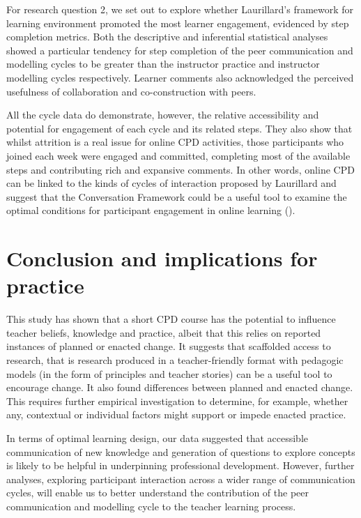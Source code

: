 \documentclass[output=paper]{langscibook}
\begin{document}
For research question 2, we set out to explore whether Laurillard’s framework for learning environment promoted the most learner engagement, evidenced by step completion metrics. Both the descriptive and inferential statistical analyses showed a particular tendency for step completion of the peer communication and modelling cycles to be greater than the instructor practice and instructor modelling cycles respectively. Learner comments also acknowledged the perceived usefulness of collaboration and co-construction with peers.

All the cycle data do demonstrate, however, the relative accessibility and potential for engagement of each cycle and its related steps. They also show that whilst attrition is a real issue for online CPD activities, those participants who joined each week were engaged and committed, completing most of the available steps and contributing rich and expansive comments. In other words, online CPD can be linked to the kinds of cycles of interaction proposed by Laurillard and suggest that the Conversation Framework could be a useful tool to examine the optimal conditions for participant engagement in online learning (\citealt{Laurillard2012}).

\section{Conclusion and implications for practice}

This study has shown that a short CPD course has the potential to influence teacher beliefs, knowledge and practice, albeit that this relies on reported instances of planned or enacted change. It suggests that scaffolded access to research, that is research produced in a teacher-friendly format with pedagogic models (in the form of principles and teacher stories) can be a useful tool to encourage change. It also found differences between planned and enacted change. This requires further empirical investigation to determine, for example, whether any, contextual or individual factors might support or impede enacted practice.

In terms of optimal learning design, our data suggested that accessible communication of new knowledge and generation of questions to explore concepts is likely to be helpful in underpinning professional development. However, further analyses, exploring participant interaction across a wider range of communication cycles, will enable us to better understand the contribution of the peer communication and modelling cycle to the teacher learning process.
\end{document}

